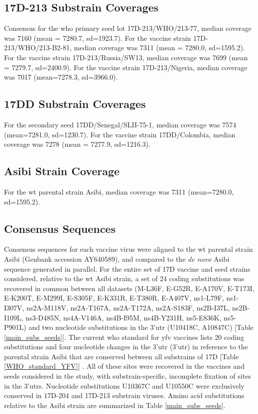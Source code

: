	\subsection{17D-213 Substrain Coverages}
Consensus for the \gls{who} primary seed lot 17D-213/WHO/213-77, median coverage was 7160 (mean = 7280.7, \gls{sd}=1923.7). For the vaccine strain 17D-213/WHO/213-B2-81, median coverage was 7311 (mean = 7280.0, \gls{sd}=1595.2). For the vaccine strain 17D-213/Russia/SW13, median coverage was 7699 (mean = 7279.7, \gls{sd}=2400.9). For the vaccine strain 17D-213/Nigeria, median coverage was 7017 (mean=7278.3, \gls{sd}=3966.0). 
	\subsection{17DD Substrain Coverages}
For the secondary seed 17DD/Senegal/SLII-75-1, median coverage was 7574 (mean=7281.0, \gls{sd}=1230.7). For the vaccine strain 17DD/Colombia, median coverage was 7278 (mean = 7277.9, \gls{sd}=1216.3). 
	\subsection{Asibi Strain Coverage}
For the \gls{wt} parental strain Asibi, median coverage was 7311 (mean=7280.0, \gls{sd}=1595.2).
	\subsection{Consensus Sequences}
Consensus sequences for each vaccine virus were aligned to the \gls{wt} parental strain Asibi (Genbank accession AY640589), and compared to the \emph{de novo} Asibi sequence generated in parallel. For the entire set of 17D vaccine and seed strains considered, relative to the \gls{wt} Asibi strain, a set of 24 coding substitutions was recovered in common between all datasets (M-L36F, E-G52R, E-A170V, E-T173I, E-K200T, E-M299I, E-S305F, E-K331R, E-T380R, E-A407V, \gls{ns}1-L79F, \gls{ns}1-I307V, \gls{ns}2A-M118V, \gls{ns}2A-T167A, \gls{ns}2A-T172A, \gls{ns}2A-S183F, \gls{ns}2B-I37L, \gls{ns}2B-I109L, \gls{ns}3-D485N, \gls{ns}4A-V146A, \gls{ns}4B-I95M, \gls{ns}4B-Y231H, \gls{ns}5-E836K, \gls{ns}5-P901L) and two nucleotide substitutions in the 3’\gls{utr} (U10418C, A10847C) [Table \ref{main_subs_seeds}]. The current \gls{who} standard for \gls{yfv} vaccines lists 20 coding substitutions and four nucleotide changes in the 3’\gls{utr} (3’\gls{utr}) in reference to the parental strain Asibi that are conserved between all substrains of 17D [Table \ref{WHO_standard_YFV}] \parencite{WorldHealthOrganization:2010wo}. All of these sites were recovered in the vaccines and seeds considered in the study, with substrain-specific, incomplete fixation of sites in the 3’\glspl{utr}. Nucleotide substitutions U10367C and U10550C were exclusively conserved in 17D-204 and 17D-213 substrain viruses. Amino acid substitutions relative to the Asibi strain are summarized in Table \ref{main_subs_seeds}.

